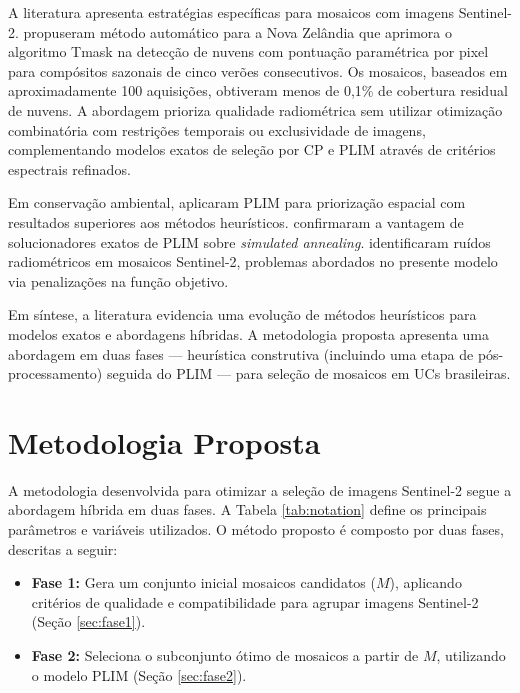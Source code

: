 \documentclass[a4paper,11pt]{article}
\begin{document}
A literatura apresenta estratégias específicas para mosaicos com imagens Sentinel-2. \citet{shepherd2020automated} propuseram método automático para a Nova Zelândia que aprimora o algoritmo Tmask na detecção de nuvens com pontuação paramétrica por pixel para compósitos sazonais de cinco verões consecutivos. Os mosaicos, baseados em aproximadamente 100 aquisições, obtiveram menos de 0,1\% de cobertura residual de nuvens. A abordagem prioriza qualidade radiométrica sem utilizar otimização combinatória com restrições temporais ou exclusividade de imagens, complementando modelos exatos de seleção por CP e PLIM \citep{combarro-simon-constraint-2023} através de critérios espectrais refinados.

Em conservação ambiental, \citet{beyer:2016} aplicaram PLIM para priorização espacial com resultados superiores aos métodos heurísticos. \citet{schuster:2020} confirmaram a vantagem de solucionadores exatos de PLIM sobre \textit{simulated annealing}. \citet{rodriguez-puerta:2024} identificaram ruídos radiométricos em mosaicos Sentinel-2, problemas abordados no presente modelo via penalizações na função objetivo.

Em síntese, a literatura evidencia uma evolução de métodos heurísticos para modelos exatos e abordagens híbridas. A metodologia proposta apresenta uma abordagem em duas fases --- heurística construtiva (incluindo uma etapa de pós-processamento) seguida do PLIM --- para seleção de mosaicos em UCs brasileiras.

\vspace{-7mm}

\section{Metodologia Proposta}
\vspace{-5mm}
A metodologia desenvolvida para otimizar a seleção de imagens Sentinel-2 segue a abordagem híbrida em duas fases. A Tabela \ref{tab:notation} define os principais parâmetros e variáveis utilizados. O método proposto é composto por duas fases, descritas a seguir:
\vspace{-4mm}

\begin{itemize}
    
    \item \textbf{Fase 1:}
    Gera um conjunto inicial mosaicos candidatos ($M$), aplicando critérios de qualidade e compatibilidade para agrupar imagens Sentinel-2 (Seção \ref{sec:fase1}).
    \vspace{-1mm}
    \item \textbf{Fase 2:}
    Seleciona o subconjunto ótimo de mosaicos a partir de $M$, utilizando o modelo PLIM (Seção \ref{sec:fase2}).
\end{itemize}
\end{document}
